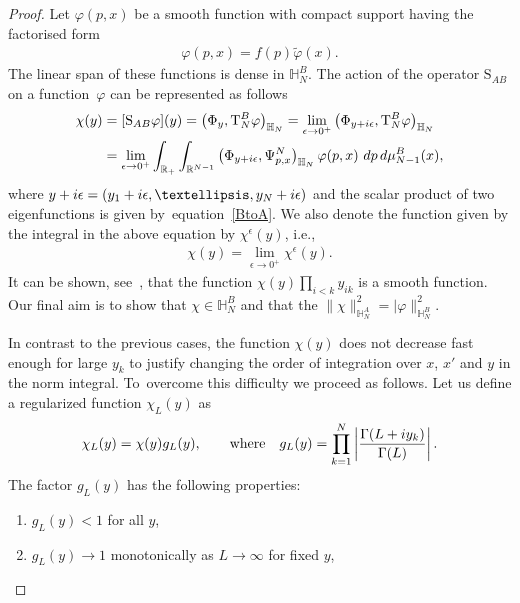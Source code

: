 \documentclass[11pt]{article}
\numberwithin{equation}{section}
\numberwithin{equation}{section}
\begin{document}
\begin{proof}
Let $\varphi(p,x)$ be a smooth function with compact support having the factorised form %
\begin{align}\label{f-factor-form}
\varphi(p,x)=f(p) \tilde \varphi(x). %
\end{align}
The linear span of these functions is dense in $\mathbb H_N^B$. The action of the operator $\mathrm S_{AB}$ on a func\-tion~$\varphi$ can be
represented as follows
\begin{align}\label{def;SAB}
\chi(y)& =[\mathrm S_{AB}\varphi](y) = \big( \Phi_y, \mathrm T_N^B \varphi \big)_{\mathbb H_N}
=\lim_{\epsilon\to 0^+} \big( \Phi_{y+{\rm i}\epsilon}, \mathrm T_N^B \varphi \big)_{\mathbb H_N} \notag
\\
&=\lim_{\epsilon\to 0^+} \int_{\mathbb R_+} \int_{\mathbb R^{N-1}} \big( \Phi_{y+{\rm i}\epsilon},\Psi^N_{p,{x}} \big)_{\mathbb H_N} \,\varphi(p, x)\,
 \, {\rm d}p\, {\rm d}\mu_{N-1}^B(x),
\end{align}
where $y+{\rm i}\epsilon=(y_1+{\rm i}\epsilon,\dots,y_N+{\rm i}\epsilon)$ and the scalar product of two eigenfunctions is given by~equa\-tion~\eqref{BtoA}. We also
denote the function given by the integral in the above equation by $\chi^\epsilon(y)$, i.e.,
\begin{gather*}
\chi(y)=\lim_{\epsilon\to 0^+}\chi^\epsilon(y).
\end{gather*}
It can be shown, see~\cite[Lemma~3.1]{Kozlowski:2014jka}, that the function $\chi( y)\prod_{i<k} y_{ik} $ is a smooth function. Our final aim is to show that $\chi\in \mathbb H_N^B$ and that the $\|\chi\|^2_{\mathbb H_N^A}=|\varphi\|^2_{\mathbb H_N^B}$.

In contrast to the previous cases, the function $\chi(y)$ does not decrease fast enough for large $ y_k $ to justify changing the order of
integration over $x$, $x'$ and $ y $ in the norm integral. To~overcome this difficulty we proceed as follows. Let us define a regularized
function $\chi_L( y)$ as
\begin{gather*}
\chi_L( y)=\chi(y) g_L( y), \qquad \text{where} \quad
g_L( y)=\prod_{k=1}^N\left|\frac{\Gamma(L+{\rm i}y_k)}{\Gamma(L)}\right|.
\end{gather*}
The factor $g_L(y)$ has the following properties:
\begin{enumerate}[label=($\roman*$)]

\item $g_L( y)<1$ for all $ y$,%

\item $g_L(y)\to 1$ monotonically as $L\to\infty$ for fixed $y$,%


\end{enumerate}
\end{proof}
\end{document}
